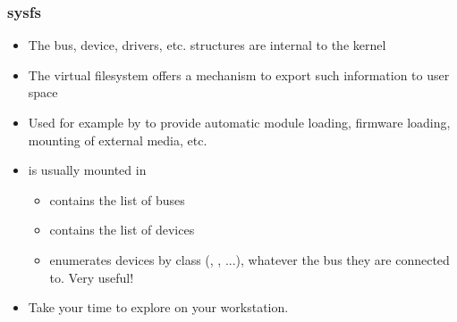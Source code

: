 \begin{frame}
  \frametitle{sysfs}
  \begin{itemize}
  \item The bus, device, drivers, etc. structures are internal to the
    kernel
  \item The  virtual filesystem offers a mechanism to
    export such information to user space
  \item Used for example by  to provide automatic module loading,
    firmware loading, mounting of external media, etc.
  \item {} is usually mounted in 
    \begin{itemize}
    \item {} contains the list of buses
    \item {} contains the list of devices
    \item {} enumerates devices by class (,
      , ...), whatever the bus they are connected
      to. Very useful!
    \end{itemize}
  \item Take your time to explore  on your workstation.
  \end{itemize}
\end{frame}

